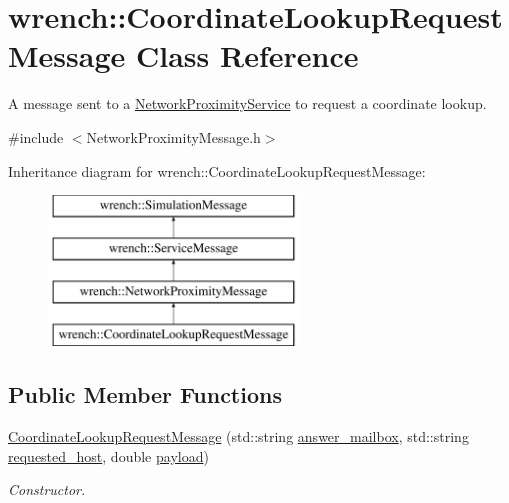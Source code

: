 \hypertarget{classwrench_1_1_coordinate_lookup_request_message}{}\section{wrench\+:\+:Coordinate\+Lookup\+Request\+Message Class Reference}
\label{classwrench_1_1_coordinate_lookup_request_message}


A message sent to a \hyperlink{classwrench_1_1_network_proximity_service}{Network\+Proximity\+Service} to request a coordinate lookup.  




{\ttfamily \#include $<$Network\+Proximity\+Message.\+h$>$}

Inheritance diagram for wrench\+:\+:Coordinate\+Lookup\+Request\+Message\+:\begin{figure}[H]
\begin{center}
\leavevmode
\includegraphics[height=4.000000cm]{classwrench_1_1_coordinate_lookup_request_message}
\end{center}
\end{figure}
\subsection*{Public Member Functions}
\begin{DoxyCompactItemize}
\item 
\hyperlink{classwrench_1_1_coordinate_lookup_request_message_add73a19bf3264991e80ac729e53386a5}{Coordinate\+Lookup\+Request\+Message} (std\+::string \hyperlink{classwrench_1_1_coordinate_lookup_request_message_a0091dffe98f45b5a4ec3334fcba93589}{answer\+\_\+mailbox}, std\+::string \hyperlink{classwrench_1_1_coordinate_lookup_request_message_a140e42fa600294b3e3708cd98b0ef68d}{requested\+\_\+host}, double \hyperlink{classwrench_1_1_simulation_message_a914f2732713f7c02898e66f05a7cb8a1}{payload})
\begin{DoxyCompactList}\small\item\em Constructor. \end{DoxyCompactList}\end{DoxyCompactItemize}
